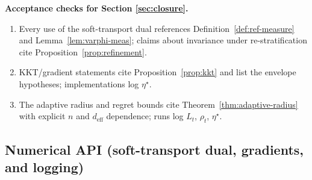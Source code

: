 \documentclass[10pt]{article}
\begin{document}
\begin{mdframed}
\textbf{Acceptance checks for Section \ref{sec:closure}.}
\begin{enumerate}[leftmargin=*]
\item Every use of the soft-transport dual references Definition~\ref{def:ref-measure} and Lemma~\ref{lem:varphi-meas}; claims about invariance under re-stratification cite Proposition~\ref{prop:refinement}.
\item KKT/gradient statements cite Proposition~\ref{prop:kkt} and list the envelope hypotheses; implementations log $\eta^\star$.
\item The adaptive radius and regret bounds cite Theorem~\ref{thm:adaptive-radius} with explicit $n$ and $d_{\mathrm{eff}}$ dependence; runs log $\widehat L_t$, $\rho_t$, $\eta^\star$.
\end{enumerate}
\end{mdframed}

\subsection*{Numerical API (soft-transport dual, gradients, and logging)}
\end{document}
